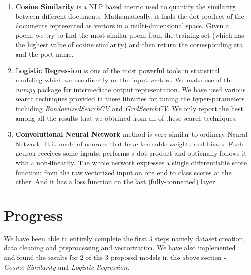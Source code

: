 \documentclass[11pt,a4paper]{article}
\begin{document}
\begin{enumerate}
    \item \textbf{Cosine Similarity} is a NLP based metric used to quantify the similarity between different documents. Mathematically, it finds the dot product of the documents represented as vectors in a multi-dimensional space. Given a poem, we try to find the most similar poem from the training set (which has the highest value of cosine similarity) and then return the corresponding era and the poet name. 
    
    \item \textbf{Logistic Regression} is one of the most powerful tools in statistical modeling which we use directly on the input vectors. We make use of the \textit{numpy} package for intermediate output representation. We have used various search techniques provided in these libraries for tuning the hyper-parameters including \textit{RandomizedSearchCV} and \textit{GridSearchCV}. We only report the best among all the results that we obtained from all of these search techniques.
    
    \item \textbf{Convolutional Neural Network} method is very similar to ordinary Neural Network. It is made of neurons that have learnable weights and biases. Each neuron receives some inputs, performs a dot product and optionally follows it with a non-linearity. The whole network expresses a single differentiable score function: from the raw vectorized input on one end to class scores at the other. And it has a loss function on the last (fully-connected) layer.
    
\end{enumerate}

\section{Progress}
We have been able to entirely complete the first 3 steps namely dataset creation, data cleaning and preprocessing and vectorization. We have also implemented and found the results for 2 of the 3 proposed models in the above section - \textit{Cosine Similarity} and \textit{Logistic Regression}.
\end{document}
